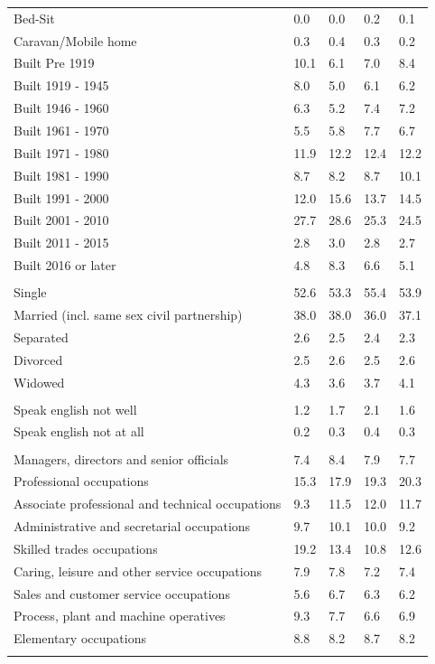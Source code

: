 \documentclass{article}
\begin{document}
\begin{table}[h]
\begin{tabular}{KTTTT}
Bed-Sit & 0.0& 0.0& 0.2& 0.1\\
Caravan/Mobile home & 0.3& 0.4& 0.3& 0.2\\
    \hline
Built Pre 1919 & 10.1&  6.1&  7.0&  8.4\\
Built 1919 - 1945 & 8.0& 5.0& 6.1& 6.2\\
Built  1946 - 1960 & 6.3& 5.2& 7.4& 7.2\\
Built  1961 - 1970 & 5.5& 5.8& 7.7& 6.7\\
Built  1971 - 1980 & 11.9& 12.2& 12.4& 12.2\\
Built  1981 - 1990 &  8.7&  8.2&  8.7& 10.1\\
Built  1991 - 2000 & 12.0& 15.6& 13.7& 14.5\\
Built  2001 - 2010 & 27.7& 28.6& 25.3& 24.5\\
Built  2011 - 2015 & 2.8& 3.0& 2.8& 2.7\\
Built  2016 or later & 4.8& 8.3& 6.6& 5.1\\
\hline
    \\
    \hline
Single & 52.6& 53.3& 55.4& 53.9\\
Married (incl. same sex civil partnership) & 38.0& 38.0& 36.0& 37.1\\
Separated  & 2.6& 2.5& 2.4& 2.3\\
Divorced  & 2.5& 2.6& 2.5& 2.6\\
Widowed & 4.3& 3.6& 3.7& 4.1\\
\hline
    \\ 
    \hline
Speak english not well & 1.2& 1.7& 2.1& 1.6\\
Speak english not at all & 0.2& 0.3& 0.4& 0.3\\
\hline
    \\
    \hline
Managers, directors and senior officials & 7.4& 8.4& 7.9& 7.7\\
Professional occupations & 15.3& 17.9& 19.3& 20.3\\
Associate professional and technical occupations &  9.3& 11.5& 12.0& 11.7\\
Administrative and secretarial occupations &  9.7& 10.1& 10.0&  9.2\\
Skilled trades occupations & 19.2& 13.4& 10.8& 12.6\\
Caring, leisure and other service occupations & 7.9& 7.8& 7.2& 7.4\\
Sales and customer service occupations & 5.6& 6.7& 6.3& 6.2\\
Process, plant and machine operatives & 9.3& 7.7& 6.6& 6.9\\
Elementary occupations & 8.8& 8.2& 8.7& 8.2\\
\hline
\end{tabular}
\end{table}
\end{document}
